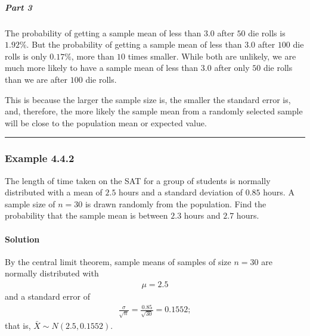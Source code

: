 \documentclass[letterpaper,10pt,english]{jupyterBook}
\begin{document}
\subparagraph{Part 3}
\label{\detokenize{Ch4 The Normal Distribution and the Central Limit Theorem/4.4 The Central Limit Theorem for Means:part-3}}
\sphinxAtStartPar
The probability of getting a sample mean of less than \(3.0\) after \(50\) die rolls is \(1.92\%\). But the probability of getting a sample mean of less than \(3.0\) after \(100\) die rolls is only \(0.17\%\), more than \(10\) times smaller. While both are unlikely, we are much more likely to have a sample mean of less than \(3.0\) after only \(50\) die rolls than we are after \(100\) die rolls.

\sphinxAtStartPar
This is because the larger the sample size is, the smaller the standard error is, and, therefore, the more likely the sample mean from a randomly selected sample will be close to the population mean or expected value.


\bigskip\hrule\bigskip



\subsubsection{Example 4.4.2}
\label{\detokenize{Ch4 The Normal Distribution and the Central Limit Theorem/4.4 The Central Limit Theorem for Means:example-4-4-2}}
\sphinxAtStartPar
The length of time taken on the SAT for a group of students is normally distributed with a mean of \(2.5\) hours and a standard deviation of \(0.85\) hours. A sample size of \(n = 30\) is drawn randomly from the population. Find the probability that the sample mean is between \(2.3\) hours and \(2.7\) hours.


\paragraph{Solution}
\label{\detokenize{Ch4 The Normal Distribution and the Central Limit Theorem/4.4 The Central Limit Theorem for Means:id1}}
\sphinxAtStartPar
By the central limit theorem, sample means of samples of size \(n = 30\) are normally distributed with
\begin{equation*}
\begin{split} \mu = 2.5 \end{split}
\end{equation*}
\sphinxAtStartPar
and a standard error of
\begin{equation*}
\begin{split} \frac{\sigma}{\sqrt{n}} = \frac{0.85}{\sqrt{30}} = 0.1552; \end{split}
\end{equation*}
\sphinxAtStartPar
that is, \(\bar{X} \sim N(2.5, 0.1552)\).
\end{document}
